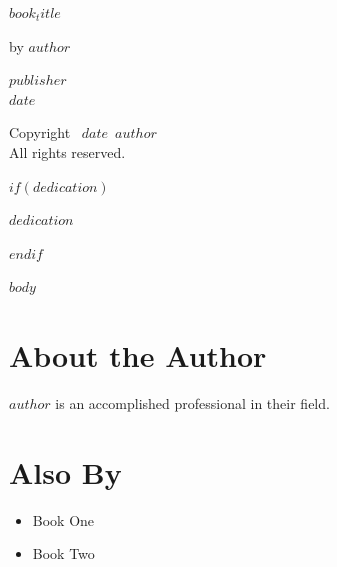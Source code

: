 \documentclass[12pt]{memoir}
\def\booktitle{$book_title$}
\def\bookauthor{$author$}
\def\bookdate{$date$}
\def\bookpublisher{$publisher$}
\begin{document}
\thispagestyle{empty}
\begin{center}
\vspace*{1in}
{\Huge\bfseries\booktitle\par}
\vspace{1in}
{\Large by \bookauthor\par}
\vfill
{\large\bookpublisher}\\
{\bookdate}
\end{center}

\clearpage
\thispagestyle{empty}
\vspace*{\fill}
\begin{center}
Copyright \textcopyright\ \bookdate\ \bookauthor\\
All rights reserved.
\end{center}
\vspace*{\fill}

$if(dedication)$
\clearpage
\thispagestyle{empty}
\vspace*{3in}
\begin{center}
\textit{$dedication$}
\end{center}
$endif$

\clearpage
\tableofcontents

$body$

\clearpage
\section*{About the Author}

\bigskip
\textit{\bookauthor} is an accomplished professional in their field.

\clearpage
\section*{Also By}

\begin{itemize}
\item Book One
\item Book Two
\end{itemize}
\end{document}
